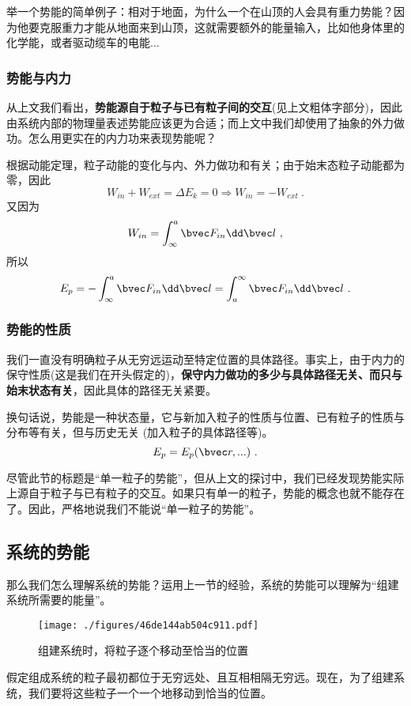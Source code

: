 举一个势能的简单例子：相对于地面，为什么一个在山顶的人会具有重力势能？因为他要克服重力才能从地面来到山顶，这就需要额外的能量输入，比如他身体里的化学能，或者驱动缆车的电能...

\subsubsection{势能与内力}
从上文我们看出，\textbf{势能源自于粒子与已有粒子间的交互}(见上文粗体字部分)，因此由系统内部的物理量表述势能应该更为合适；而上文中我们却使用了抽象的外力做功。怎么用更实在的内力功来表现势能呢？

根据动能定理，粒子动能的变化与内、外力做功和有关；由于始末态粒子动能都为零，因此
$$W_{in} + W_{ext} = \Delta E_k = 0 \Rightarrow W_{in} = -W_{ext}~.$$
又因为
$$W_{in} = \int^a_\infty \bvec F_{in} \dd \bvec l~, $$
所以
$$E_p = - \int^a_\infty \bvec F_{in} \dd \bvec l = \int^\infty_a \bvec F_{in} \dd \bvec l~.$$

\subsubsection{势能的性质}
我们一直没有明确粒子从无穷远运动至特定位置的具体路径。事实上，由于内力的保守性质(这是我们在开头假定的)，\textbf{保守内力做功的多少与具体路径无关、而只与始末状态有关}，因此具体的路径无关紧要。%

换句话说，势能是一种状态量，它与新加入粒子的性质与位置、已有粒子的性质与分布等有关，但与历史无关 (加入粒子的具体路径等)。
$$E_p=E_p(\bvec r,...)~.$$

尽管此节的标题是“单一粒子的势能”，但从上文的探讨中，我们已经发现势能实际上源自于粒子与已有粒子的交互。如果只有单一的粒子，势能的概念也就不能存在了。因此，严格地说我们不能说“单一粒子的势能”。

\subsection{系统的势能}
那么我们怎么理解系统的势能？运用上一节的经验，系统的势能可以理解为“组建系统所需要的能量”。

\begin{figure}[ht]
\centering
\texttt{[image: ./figures/46de144ab504c911.pdf]}
\caption{组建系统时，将粒子逐个移动至恰当的位置} \label{fig_POTENT_2}
\end{figure}
假定组成系统的粒子最初都位于无穷远处、且互相相隔无穷远。现在，为了组建系统，我们要将这些粒子一个一个地移动到恰当的位置。

